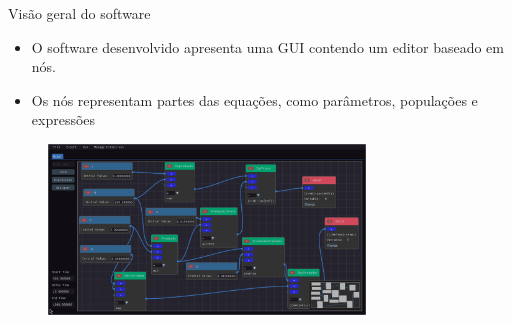 \begin{frame}{Visão geral do software}
    \begin{itemize}
        \item O software desenvolvido apresenta uma GUI contendo um editor baseado em nós.
        \item Os nós representam partes das equações, como parâmetros, populações e expressões
    \end{itemize}

    \begin{figure}
        \centering
        \includegraphics[width=0.75\textwidth]{contents/imgs/ode-designer/predador-presa-fit.png}
    \end{figure}
\end{frame}

